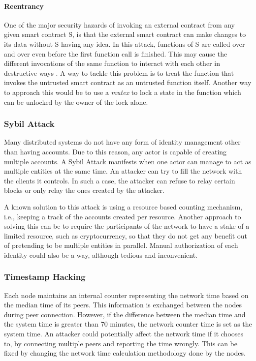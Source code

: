 \documentclass[english]{tktltiki}
\begin{document}
\paragraph{Reentrancy}
One of the major security hazards of invoking an external contract from any given smart contract S, is that the external smart contract can make changes to its data without S having any idea. In this attack, functions of S are called over and over even before the first function call is finished. This may cause the different invocations of the same function to interact with each other in destructive ways \cite{ethereum-safety}. A way to tackle this problem is to treat the function that invokes the untrusted smart contract as an untrusted function itself. Another way to approach this would be to use a \textit{mutex} to lock a state in the function which can be unlocked by the owner of the lock alone. 

\subsubsection{Sybil Attack}
Many distributed systems do not have any form of identity management other than having accounts. Due to this reason, any actor is capable of creating multiple accounts. A Sybil Attack \cite{sybil} manifests when one actor can manage to act as multiple entities at the same time. An attacker can try to fill the network with the clients it controls. In such a case, the attacker can refuse to relay certain blocks or only relay the ones created by the attacker. 

A known solution to this attack is using a resource based counting mechanism, i.e., keeping a track of the accounts created per resource. Another approach to solving this can be to require the participants of the network to have a stake of a limited resource, such as cryptocurrency, so that they do not get any benefit out of pretending to be multiple entities in parallel. Manual authorization of each identity could also be a way, although tedious and inconvenient.

\subsubsection{Timestamp Hacking}
Each node maintains an internal counter representing the network time based on the median time of its peers. This information is exchanged between the nodes during peer connection. However, if the difference between the median time and the system time is greater than 70 minutes, the network counter time is set as the system time. An attacker could potentially affect the network time if it chooses to, by connecting multiple peers and reporting the time wrongly. This can be fixed by changing the network time calculation methodology done by the nodes\cite{bitcoin-weakness}.
\end{document}
